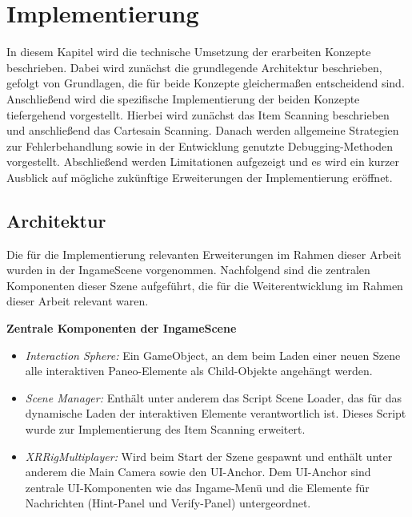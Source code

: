 \chapter{Implementierung}
\label{chap:Implementierung}


In diesem Kapitel wird die technische Umsetzung der erarbeiten Konzepte beschrieben. Dabei wird zunächst die grundlegende Architektur beschrieben, gefolgt von Grundlagen, die für beide Konzepte gleichermaßen entscheidend sind. Anschließend wird die spezifische Implementierung der beiden Konzepte tiefergehend vorgestellt. Hierbei wird zunächst das Item Scanning beschrieben und anschließend das Cartesain Scanning. Danach werden allgemeine Strategien zur Fehlerbehandlung sowie in der Entwicklung genutzte Debugging-Methoden vorgestellt. Abschließend werden Limitationen aufgezeigt und es wird ein kurzer Ausblick auf mögliche zukünftige Erweiterungen der Implementierung eröffnet. 

\section{Architektur}
Die für die Implementierung relevanten Erweiterungen im Rahmen dieser Arbeit wurden in der IngameScene vorgenommen. Nachfolgend sind die zentralen Komponenten dieser Szene aufgeführt, die für die Weiterentwicklung im Rahmen dieser Arbeit relevant waren. 

{\normalfont \bfseries Zentrale Komponenten der IngameScene}

\begin{itemize}
    \item \textit{Interaction Sphere:} Ein GameObject, an dem beim Laden einer neuen Szene alle interaktiven Paneo-Elemente als Child-Objekte angehängt werden.
    \item \textit{Scene Manager:} Enthält unter anderem das Script Scene Loader, das für das dynamische Laden der interaktiven Elemente verantwortlich ist. Dieses Script wurde zur Implementierung des Item Scanning erweitert. 
    \item \textit{XRRigMultiplayer:} Wird beim Start der Szene gespawnt und enthält unter anderem die Main Camera sowie den UI-Anchor. Dem UI-Anchor sind zentrale UI-Komponenten wie das Ingame-Menü und die Elemente für Nachrichten (Hint-Panel und Verify-Panel) untergeordnet.    
\end{itemize}

